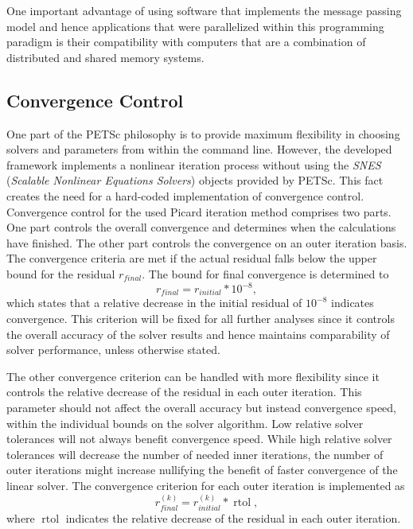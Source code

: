 One important advantage of using software that implements the message passing model and hence applications that were parallelized within this programming paradigm is their compatibility with computers that are a combination of distributed and shared memory systems.

\subsection{Convergence Control} 
\label{sec:convergence}
One part of the PETSc philosophy is to provide maximum flexibility in choosing solvers and parameters from within the command line. However, the developed framework implements a nonlinear iteration process without using the \emph{SNES} (\emph{Scalable Nonlinear Equations Solvers}) objects provided by PETSc. This fact creates the need for a hard-coded implementation of convergence control. Convergence control for the used Picard iteration method comprises two parts. One part controls the overall convergence and determines when the calculations have finished. The other part controls the convergence on an outer iteration basis. The convergence criteria are met if the actual residual falls below the upper bound for the residual \(r_{final}\). The bound for final convergence is determined to
\begin{displaymath}
  r_{final} = r_{initial} * 10^{-8},
\end{displaymath}
which states that a relative decrease in the initial residual of \(10^{-8}\) indicates convergence. This criterion will be fixed for all further analyses since it controls the overall accuracy of the solver results and hence maintains comparability of solver performance, unless otherwise stated. 

The other convergence criterion can be handled with more flexibility since it controls the relative decrease of the residual in each outer iteration. This parameter should not affect the overall accuracy but instead convergence speed, within the individual bounds on the solver algorithm. Low relative solver tolerances will not always benefit convergence speed. While high relative solver tolerances will decrease the number of needed inner iterations, the number of outer iterations might increase nullifying the benefit of faster convergence of the linear solver. The convergence criterion for each outer iteration is implemented as
\begin{displaymath}
  r_{final}^{(k)} = r_{initial}^{(k)} * \operatorname{rtol},
\end{displaymath}
where \(\operatorname{rtol}\) indicates the relative decrease of the residual in each outer iteration. 

